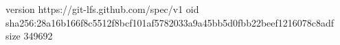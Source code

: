 version https://git-lfs.github.com/spec/v1
oid sha256:28a16b166f8c5512f8bcf101af5782033a9a45bb5d0fbb22beef1216078c8adf
size 349692

